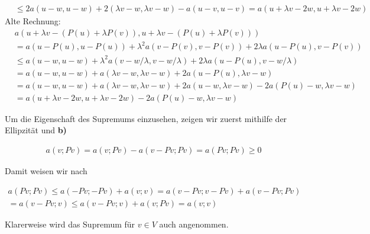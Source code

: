 \begin{solution}
\begin{enumerate}[label = \textbf{\alph*)}]
\begin{align*}
      &\leq 2a(u - w, u - w) +  2(\lambda v - w, \lambda v - w)
      - a(u-v,u-v) = a(u + \lambda v - 2w, u + \lambda v - 2w)
    \end{align*}
    Alte Rechnung:
    \begin{align*}
      &
      a(u + \lambda v - (P(u) + \lambda P(v)), u + \lambda v - (P(u) + \lambda P(v))) \\
      & =
      a(u - P(u), u - P(u))
      +
      \lambda^2 a(v - P(v), v - P(v))
      +
      2 \lambda a(u - P(u), v - P(v)) \\
      & \leq
      a(u - w, u - w)
      +
      \lambda^2 a(v - w / \lambda, v - w / \lambda)
      +
      2 \lambda a(u - P(u), v - w/\lambda) \\
      & =
      a(u - w, u - w)
      +
      a(\lambda v - w, \lambda v - w)
      +
      2 a(u - P(u), \lambda v - w) \\
      &=   a(u - w, u - w)
        +
        a(\lambda v - w, \lambda v - w)
        +
        2 a(u -w, \lambda v - w) - 2a(P(u) -w, \lambda v - w) \\
      &= a(u + \lambda v - 2w, u + \lambda v - 2w) - 2a(P(u) -w, \lambda v - w)
    \end{align*}

  Um die Eigenschaft des Supremums einzusehen, zeigen wir zuerst mithilfe der Ellipzität und \textbf{b)}

  \begin{align*}
    a(v; Pv)
    =
    a(v; Pv) - a(v-Pv; Pv)
    =
    a(Pv; Pv)
    \geq
    0
  \end{align*}

  Damit weisen wir nach

  \begin{multline*}
    a(Pv; Pv)
    \leq
    a(-Pv; -Pv) + a(v; v)
    =
    a(v-Pv; v-Pv) + a(v-Pv; Pv) \\
    =
    a(v-Pv; v)
    \leq
    a(v-Pv; v) + a(v; Pv)
    =
    a(v; v)
  \end{multline*}

  Klarerweise wird das Supremum für $v \in V$ auch angenommen.
\end{enumerate}

\end{solution}

